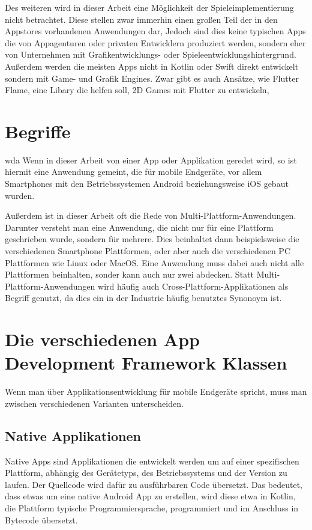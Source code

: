 Des weiteren wird in dieser Arbeit eine Möglichkeit der Spieleimplementierung nicht betrachtet. Diese stellen zwar immerhin einen großen Teil der in den Appstores vorhandenen Anwendungen dar, Jedoch sind dies keine typischen Apps die von Appagenturen oder privaten Entwicklern produziert werden, sondern eher von Unternehmen mit Grafikentwicklungs- oder Spieleentwicklungshintergrund. Außerdem werden die meisten Apps nicht in Kotlin oder Swift direkt entwickelt sondern mit Game- und Grafik Engines. Zwar gibt es auch Ansätze, wie Flutter Flame, eine Libary die helfen soll, 2D Games mit Flutter zu entwickeln, 

\section{Begriffe}
wda
Wenn in dieser Arbeit von einer App oder Applikation geredet wird, so ist hiermit eine Anwendung gemeint, die für mobile Endgeräte, vor allem Smartphones mit den Betriebssystemen Android beziehungsweise iOS gebaut wurden.

Außerdem ist in dieser Arbeit oft die Rede von Multi-Plattform-Anwendungen. Darunter versteht man eine Anwendung, die nicht nur für eine Plattform geschrieben wurde, sondern für mehrere. Dies beinhaltet dann beispielsweise die verschiedenen Smartphone Plattformen, oder aber auch die verschiedenen PC Plattformen wie Linux oder MacOS. Eine Anwendung muss dabei auch nicht alle Plattformen beinhalten, sonder kann auch nur zwei abdecken. Statt Multi-Plattform-Anwendungen wird häufig auch Cross-Plattform-Applikationen als Begriff genutzt, da dies ein in der Industrie häufig benutztes Synonoym ist. 

\section{Die verschiedenen App Development Framework Klassen}
Wenn man über Applikationsentwicklung für mobile Endgeräte spricht, muss man zwischen  verschiedenen Varianten unterscheiden.
\subsection{Native Applikationen}
Native Apps sind Applikationen die entwickelt werden um auf einer spezifischen Plattform, abhängig des Gerätetyps, des Betriebssystems und der Version zu laufen. Der Quellcode wird dafür zu ausführbaren Code übersetzt.\cite{IEEE_development_classes}
Das bedeutet, dass etwas um eine native Android App zu erstellen, wird diese etwa in Kotlin, die Plattform typische Programmiersprache, programmiert und im Anschluss in Bytecode übersetzt.

